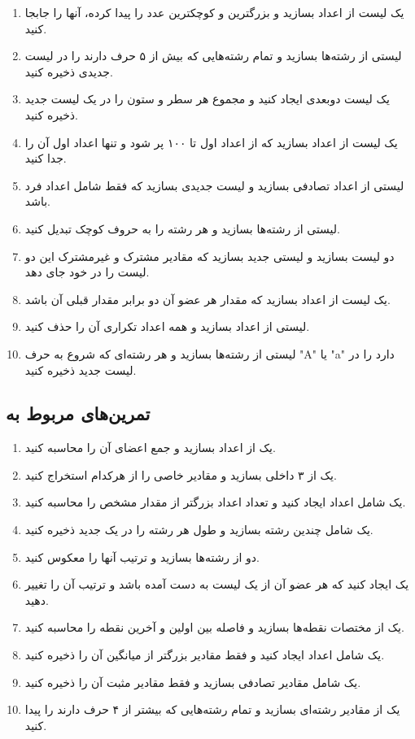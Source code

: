 \documentclass[b5paper,12pt]{article}
\begin{document}
	\begin{enumerate}
		\item یک لیست از اعداد بسازید و بزرگترین و کوچکترین عدد را پیدا کرده، آنها را جابجا کنید.
		\item لیستی از رشته‌ها بسازید و تمام رشته‌هایی که بیش از ۵ حرف دارند را در لیست جدیدی ذخیره کنید.
		\item یک لیست دو‌بعدی ایجاد کنید و مجموع هر سطر و ستون را در یک لیست جدید ذخیره کنید.
		\item یک لیست از اعداد بسازید که از اعداد اول تا ۱۰۰ پر شود و تنها اعداد اول آن را جدا کنید.
		\item لیستی از اعداد تصادفی بسازید و لیست جدیدی بسازید که فقط شامل اعداد فرد باشد.
		\item لیستی از رشته‌ها بسازید و هر رشته را به حروف کوچک تبدیل کنید.
		\item دو لیست بسازید و لیستی جدید بسازید که مقادیر مشترک و غیرمشترک این دو لیست را در خود جای دهد.
		\item یک لیست از اعداد بسازید که مقدار هر عضو آن دو برابر مقدار قبلی آن باشد.
		\item لیستی از اعداد بسازید و همه اعداد تکراری آن را حذف کنید.
		\item لیستی از رشته‌ها بسازید و هر رشته‌ای که شروع به حرف "A" یا "a" دارد را در لیست جدید ذخیره کنید.
	\end{enumerate}
	
	\subsection*{تمرین‌های مربوط به }
	
	\begin{enumerate}
		\item یک  از اعداد بسازید و جمع اعضای آن را محاسبه کنید.
		\item یک  از ۳  داخلی بسازید و مقادیر خاصی را از هرکدام استخراج کنید.
		\item یک  شامل اعداد ایجاد کنید و تعداد اعداد بزرگتر از مقدار مشخص را محاسبه کنید.
		\item یک  شامل چندین رشته بسازید و طول هر رشته را در یک  جدید ذخیره کنید.
		\item دو  از رشته‌ها بسازید و ترتیب آنها را معکوس کنید.
		\item یک  ایجاد کنید که هر عضو آن از یک لیست به دست آمده باشد و ترتیب آن را تغییر دهید.
		\item یک  از مختصات نقطه‌ها بسازید و فاصله بین اولین و آخرین نقطه را محاسبه کنید.
		\item یک  شامل اعداد ایجاد کنید و فقط مقادیر بزرگتر از میانگین آن را ذخیره کنید.
		\item یک  شامل مقادیر تصادفی بسازید و فقط مقادیر مثبت آن را ذخیره کنید.
		\item یک  از مقادیر رشته‌ای بسازید و تمام رشته‌هایی که بیشتر از ۴ حرف دارند را پیدا کنید.
	\end{enumerate}
	
\end{document}
